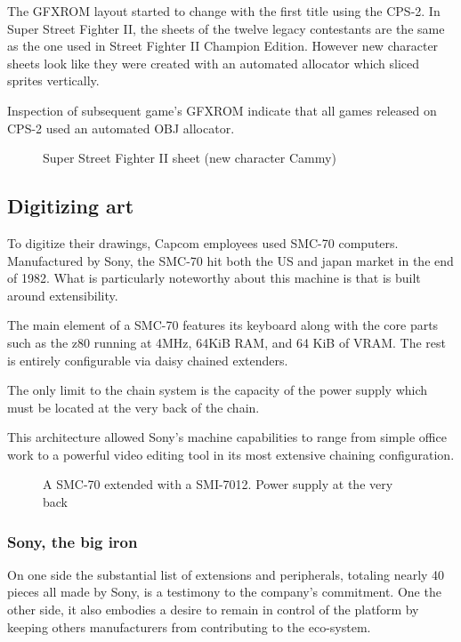 The GFXROM layout started to change with the first title using the CPS-2. In Super Street Fighter II, the sheets of the twelve legacy contestants are the same as the one used in Street Fighter II Champion Edition. However new character sheets look like they were created with an automated allocator which sliced sprites vertically.

Inspection of subsequent game's GFXROM indicate that all games released on CPS-2 used an automated OBJ allocator.

 \begin{figure}[H]
\caption*{Super Street Fighter II sheet (new character Cammy)}
\end{figure}



\subsection{Digitizing art}

To digitize their drawings, Capcom employees used SMC-70 computers. Manufactured by Sony, the SMC-70 hit both the US and japan market in the end of 1982. What is particularly noteworthy about this machine is that is built around extensibility. 

The main element of a SMC-70 features its keyboard along with the core parts such as the z80 running at 4MHz, 64KiB RAM, and 64 KiB of VRAM. The rest is entirely configurable via daisy chained extenders. 

The only limit to the chain system is the capacity of the power supply which must be located at the very back of the chain. 


This architecture allowed Sony's machine capabilities to range from simple office work to a powerful video editing tool in its most extensive chaining configuration. 

\begin{figure}[H]
\caption*{A SMC-70 extended with a SMI-7012. Power supply at the very back}
\end{figure}

\subsubsection{Sony, the big iron}
On one side the substantial list of extensions and peripherals, totaling nearly 40 pieces all made by Sony, is a testimony to the company's commitment. One the other side, it also embodies a desire to remain in control of the platform by keeping others manufacturers from contributing to the eco-system.

